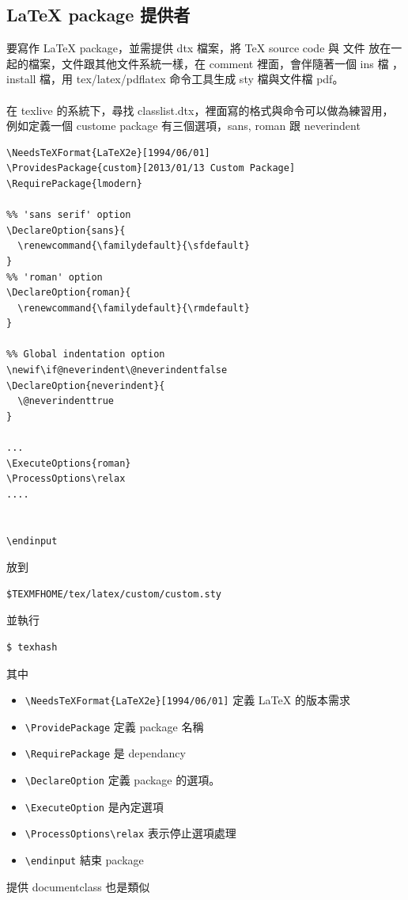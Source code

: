   \subsection{\LaTeX{} package 提供者}
  要寫作 \LaTeX{} package，並需提供 dtx 檔案，將 \TeX{} source code 與 文件
  放在一起的檔案，文件跟其他文件系統一樣，在 comment 裡面，會伴隨著一個 ins 檔
  ，install 檔，用 tex/latex/pdflatex 命令工具生成 sty 檔與文件檔 pdf。
  \\\\
  在 texlive 的系統下，尋找 classlist.dtx，裡面寫的格式與命令可以做為練習用，
  例如定義一個 custome package 有三個選項，sans, roman 跟 neverindent
  \begin{verbatim}
\NeedsTeXFormat{LaTeX2e}[1994/06/01]
\ProvidesPackage{custom}[2013/01/13 Custom Package]
\RequirePackage{lmodern}

%% 'sans serif' option
\DeclareOption{sans}{
  \renewcommand{\familydefault}{\sfdefault}
}
%% 'roman' option
\DeclareOption{roman}{
  \renewcommand{\familydefault}{\rmdefault}
}

%% Global indentation option
\newif\if@neverindent\@neverindentfalse
\DeclareOption{neverindent}{
  \@neverindenttrue
}

...
\ExecuteOptions{roman}
\ProcessOptions\relax
....


\endinput
  \end{verbatim}
  放到
  \begin{verbatim}
$TEXMFHOME/tex/latex/custom/custom.sty
  \end{verbatim}
  並執行
  \begin{verbatim}
$ texhash
  \end{verbatim}
  其中
  \begin{itemize}
    \item \verb=\NeedsTeXFormat{LaTeX2e}[1994/06/01]= 定義 LaTeX 的版本需求
    \item \verb=\ProvidePackage= 定義 package 名稱
    \item \verb=\RequirePackage= 是 dependancy
    \item \verb=\DeclareOption= 定義 package 的選項。
    \item \verb=\ExecuteOption= 是內定選項
    \item \verb=\ProcessOptions\relax= 表示停止選項處理
    \item \verb=\endinput= 結束 package
  \end{itemize}
  提供 documentclass 也是類似
